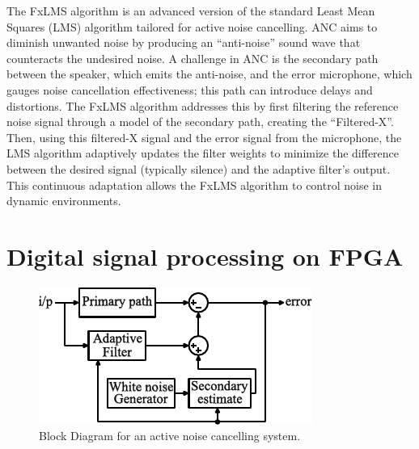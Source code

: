 The FxLMS algorithm is an advanced version of the standard Least Mean Squares (LMS) algorithm tailored for active noise cancelling. ANC aims to diminish unwanted noise by producing an ``anti-noise'' sound wave that counteracts the undesired noise. A challenge in ANC is the secondary path between the speaker, which emits the anti-noise, and the error microphone, which gauges noise cancellation effectiveness; this path can introduce delays and distortions. The FxLMS algorithm addresses this \cite{ANC_Headphone_11} by first filtering the reference noise signal through a model of the secondary path, creating the ``Filtered-X''. Then, using this filtered-X signal and the error signal from the microphone, the LMS algorithm adaptively updates the filter weights to minimize the difference between the desired signal (typically silence) and the adaptive filter's output. This continuous adaptation allows the FxLMS algorithm to control noise in dynamic environments.

\section{Digital signal processing on FPGA}

\begin{figure}[h]
\centerline{\includegraphics[width=0.6\linewidth]{3-literature/ANCHeadphoneFPGA.pdf}}
\caption{Block Diagram for an active noise cancelling system.}
\label{fig_ANCHeadphoneFPGA}
\end{figure}

